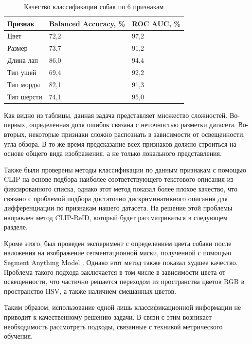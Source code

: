 \begin{table}[]
    \centering
    \caption{Качество классификации собак по 6 признакам}
    \begin{tabular}{|l|l|l|}
        \hline
        \multicolumn{1}{|l|}{Признак} & \multicolumn{1}{l|}{Balanced Accuracy, \%} & 
        \multicolumn{1}{l|}{ROC AUC, \%}\\ \hline
        Цвет & 72,2 & 97,2 \\ \hline
        Размер & 73,7 & 91,2 \\ \hline
        Длина лап & 86,0 & 94,4 \\ \hline
        Тип ушей & 69,4 & 92,2 \\ \hline
        Тип морды & 82,1 & 91,3 \\ \hline
        Тип шерсти & 74,1 & 95,0 \\ \hline
    \end{tabular}
    \label{tab:classification_results}
\end{table}

Как видно из таблицы, данная задача представляет множество сложностей. Во-первых, определенная доля ошибок связана с неточностью разметки датасета. Во-вторых, некоторые признаки сложно распознать в зависимости от освещенности, угла обзора. В то же время предсказание всех признаков должно строиться на основе общего вида изображения, а не только локального представления.

Также были проверены методы классификации по данным признакам с помощью CLIP на основе подбора наиболее соответствующего текстового описания из фиксированного списка, однако этот метод показал более плохое качество, что связано с проблемой подбора достаточно дискриминативного описания для дифференциации по признакам нашего датасета. На решение этой проблемы направлен метод CLIP-ReID, который будет рассматриваться в следующем разделе.

Кроме этого, был проведен эксперимент с определением цвета собаки после наложения на изображение сегментационной маски, полученной с помощью Segment Anything Model \cite{kirillov2023segment}. Однако этот метод также показал худшее качество. Проблема такого подхода заключается в том числе в зависимости цвета от освещенности, что частично решается переходом из пространства цветов RGB в пространство HSV, а также наличием смешанных цветов.

Таким образом, использование одной лишь классификационной информации не приводит к качественному решению задачи. В связи с этим возникает необходимость рассмотреть подходы, связанные с техникой метрического обучения.


